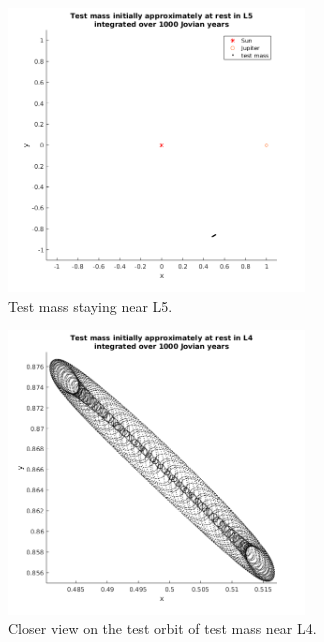 \documentclass[12pt,a4paper,titlepage]{article}
\begin{document}
\begin{figure}
\centering
\includegraphics[width=0.7\textwidth]{../plots/L5-stationary.png}
\caption{Test mass staying near L5.}
\label{L5-stationary}
\end{figure}

\begin{figure}
\centering
\includegraphics[width=0.7\textwidth]{../plots/L4-stationary-zoom.png}
\caption{Closer view on the test orbit of test mass near L4.}
\label{L4-zoom}
\end{figure}
\end{document}
